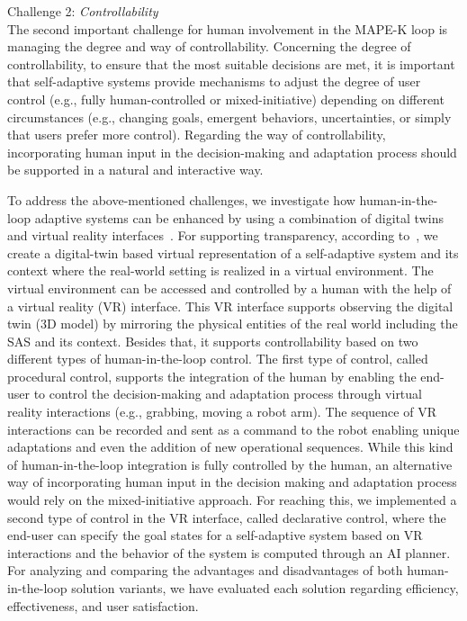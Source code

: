 \documentclass[10pt, conference]{IEEEtran}
\begin{document}
Challenge 2: \textit{Controllability} \\
The second important challenge for human involvement in the MAPE-K loop is managing the degree and way of controllability. Concerning the degree of controllability, to ensure that the most suitable decisions are met, it is important that self-adaptive systems provide mechanisms to adjust the degree of user control (e.g., fully human-controlled or mixed-initiative) depending on different circumstances (e.g., changing goals, emergent behaviors, uncertainties, or simply that users prefer more control). Regarding the way of controllability, incorporating human input in the decision-making and adaptation process should be supported in a natural and interactive way.

To address the above-mentioned challenges, we investigate how human-in-the-loop adaptive systems can be enhanced by using a combination of digital twins~\cite{DBLP:conf/icse/JosifovskaYE19} and virtual reality interfaces~\cite{PAN200620}. For supporting transparency, according to~\cite{DBLP:conf/iot/KritzlerFMR17}, we create a digital-twin based virtual representation of a self-adaptive system and its context where the real-world setting is realized in a virtual environment. The virtual environment can be accessed and controlled by a human with the help of a virtual reality (VR) interface. This VR interface supports observing the digital twin (3D model) by mirroring the physical entities of the real world including the SAS and its context. Besides that, it supports controllability based on two different types of human-in-the-loop control. The first type of control, called procedural control, supports the integration of the human by enabling the end-user to control the decision-making and adaptation process through virtual reality interactions (e.g., grabbing, moving a robot arm). The sequence of VR interactions can be recorded and sent as a command to the robot enabling unique adaptations and even the addition of new operational sequences. While this kind of human-in-the-loop integration is fully controlled by the human, an alternative way of incorporating human input in the decision making and adaptation process would rely on the mixed-initiative approach. For reaching this, we implemented a second type of control in the VR interface, called declarative control, where the end-user can specify the goal states for a self-adaptive system based on VR interactions and the behavior of the system is computed through an AI planner. For analyzing and comparing the advantages and disadvantages of both human-in-the-loop solution variants, we have evaluated each solution regarding efficiency, effectiveness, and user satisfaction. 
\end{document}
